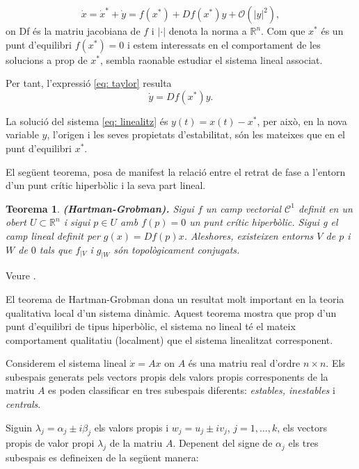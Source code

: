 \documentclass[11pt,a4paper,openright,oneside]{article}
\numberwithin{equation}{section}
\newtheorem{teo}{Teorema}[section]
\theoremstyle{definition}
\begin{document}
\begin{equation} \label{eq: taylor}
    \dot{x}=\dot{x}^{*}+\dot{y}=f\left(x^{*}\right)+Df\left(x^{*}\right)y+\mathcal{O}\left(|y|^{2}\right),
\end{equation}
on Df és la matriu jacobiana de $f$ i $|\cdot|$ denota la norma a $\mathbb{R}^{n}$. Com que $x^{*}$ és un punt d'equilibri $f(x^{*})=0$ i estem interessats en el comportament de les solucions a prop de $x^{*}$, sembla raonable estudiar el sistema lineal associat. 

Per tant, l'expressió \eqref{eq: taylor} resulta 
\begin{equation} \label{eq: linealitz}
    \dot{y}=Df\left(x^{*}\right)y.
\end{equation}

La solució del sistema \eqref{eq: linealitz} és $y(t)=x(t)-x^{*}$, per això, en la nova variable $y$, l'origen i les seves propietats d'estabilitat, són les mateixes que en el punt d'equilibri $x^{*}$.

El següent teorema, posa de manifest la relació entre el retrat de fase a l'entorn d'un punt crític hiperbòlic i la seva part lineal.

\begin{teo} \label{teo: Hartman-Grobman} 
    \textbf{(Hartman-Grobman).} Sigui $f$ un camp vectorial $\mathcal{C}^{1}$ definit en un obert $U \subset \mathbb{R}^{n}$ i sigui $p\in U$ amb $f(p)=0$ un punt crític hiperbòlic. Sigui g el camp lineal definit per $g(x)=Df(p)x$. Aleshores, existeixen entorns $V$ de $p$ i $W$ de $0$ tals que $f_{|V}$ i $g_{|W}$ són topològicament conjugats.
\end{teo}

\proof Veure \cite{Hartman}.

El teorema de Hartman-Grobman dona un resultat molt important en la teoria qualitativa local d'un sistema dinàmic. Aquest teorema mostra que prop d'un punt d'equilibri de tipus hiperbòlic, el sistema no lineal té el mateix comportament qualitatiu (localment) que el sistema linealitzat corresponent.

Considerem el sistema lineal $\dot{x}=Ax$ on $A$ és una matriu real d'ordre $n\times n$. Els subespais generats pels vectors propis dels valors propis corresponents de la matriu $A$ es poden classificar en tres subespais diferents: \textit{estables, inestables} i \textit{centrals}. 

Siguin $\lambda_j=\alpha_j\pm i\beta_j$ els valors propis i $w_j=u_j \pm iv_j$, $j=1,\ldots,k$, els vectors propis de valor propi $\lambda_j$ de la matriu $A$. Depenent del signe de $\alpha_j$ els tres subespais es defineixen de la següent manera:
\end{document}
